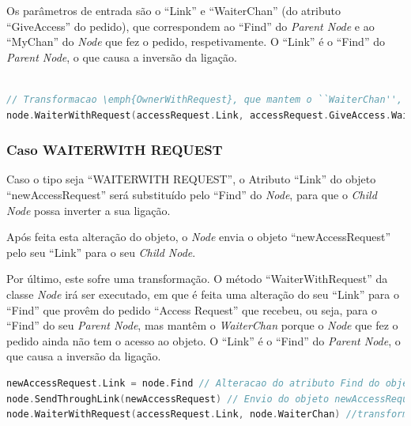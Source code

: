 Os parâmetros de entrada são o ``Link'' e ``WaiterChan'' (do atributo ``GiveAccess'' do pedido), que correspondem ao ``Find'' do \emph{Parent Node} e ao ``MyChan'' do \emph{Node} que fez o pedido, respetivamente.
O ``Link'' é o ``Find'' do \emph{Parent Node}, o que causa a inversão da ligação.

\begin{lstlisting}[caption={Comportamento do \emph{Node} tipo \emph{Waiter Terminal} caso receba um pedido \emph{Access Request} no \emph{Channel ``Find''}},language=Go]

// Transformacao \emph{OwnerWithRequest}, que mantem o ``WaiterChan'', mas atualiza o ``Link''.
node.WaiterWithRequest(accessRequest.Link, accessRequest.GiveAccess.WaiterChan)
\end{lstlisting}


\subsubsection*{Caso WAITER\textunderscore WITH \textunderscore REQUEST}	
Caso o tipo seja ``WAITER\textunderscore WITH \textunderscore REQUEST'', o Atributo ``Link'' do objeto ``newAccessRequest'' será substituído pelo ``Find'' do \emph{Node},
para que o \emph{Child Node} possa inverter a sua ligação.

Após feita esta alteração do objeto, o \emph{Node} envia o objeto ``newAccessRequest'' pelo seu ``Link'' para o seu \emph{Child Node}.

Por último, este sofre uma transformação. O método ``WaiterWithRequest'' da classe \emph{Node} irá ser executado, 
em que é feita uma alteração do seu ``Link'' para o ``Find'' que provêm do pedido ``Access Request'' que recebeu, ou seja, para o ``Find'' do seu \emph{Parent Node}, 
mas mantêm o \emph{WaiterChan} porque o \emph{Node} que fez o pedido ainda não tem o acesso ao objeto.
O ``Link'' é o ``Find'' do \emph{Parent Node}, o que causa a inversão da ligação.

\begin{lstlisting}[caption={Comportamento do \emph{Node} tipo \emph{Waiter With Request} caso receba um pedido \emph{Access Request} no \emph{Channel ``Find''}},language=Go]
newAccessRequest.Link = node.Find // Alteracao do atributo Find do objeto newAccessRequest para o Find do Node
node.SendThroughLink(newAccessRequest) // Envio do objeto newAccessRequest pelo link
node.WaiterWithRequest(accessRequest.Link, node.WaiterChan) //transformacao do Node. Mantem-se o WaiterChan mas altera-se o Link
\end{lstlisting}

